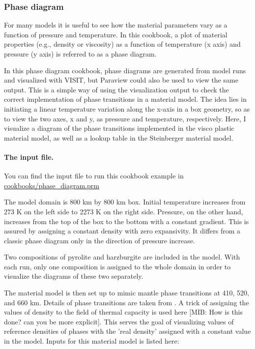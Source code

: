\subsubsection{Phase diagram}

\label{sec:phase-diagram}
For many models it is useful to see how the material parameters vary as a function of pressure and temperature. In this cookbook, a plot of material properties (e.g., density or viscosity) as a function of temperature (x axis) and pressure (y axis) is referred to as a phase diagram. 

In this phase diagram cookbook, phase diagrams are generated from model runs and visualized with VISIT, but Paraview could also be used to view the same output. %
This is a simple way of using the visualization output to check the correct implementation of phase transitions in a material model. 
The idea lies in initiating a linear temperature variation along the x-axis in a box geometry, so as to view the two axes, x and y,  as pressure and temperature, respectively. %
Here, I visualize a diagram of the phase transitions implemented in the visco plastic material model, as well as a lookup table in the Steinberger material model. 

\paragraph{The input file.}
You can find the input file to run this cookbook example in \url{cookbooks/phase_diagram.prm}

\par The model domain is  800 km  by 800 km box. %
Initial temperature increases from 273 K on the left side to 2273 K on the right side. %
Pressure, on the other hand, increases from the top of the box to the bottom with a constant gradient.
This is assured by assigning a constant density with zero expansivity.
It differs from a classic phase diagram only in the direction of pressure increase.

\par Two compositions of pyrolite and harzburgite are included in the model. %
With each run, only one composition is assigned to the whole domain in order to visualize the diagrams of these two separately.

\par The material model is then set up to mimic mantle phase transitions at 410, 520, and 660 km.%
Details of phase transitions are taken from \cite{billen2018decoupling}.
A trick of assigning the values of density to the field of thermal capacity is used here [MIB: How is this done? can you be more explicit]. %
This serves the goal of visualizing values of reference densities of phases with the 'real density' assigned with a constant value in the model.
Inputs for this material model is listed here:



